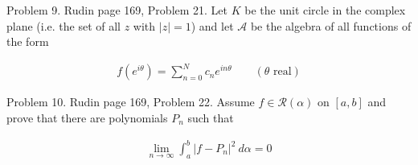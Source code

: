 \documentclass{article}
\begin{document}
 \pagebreak
 {\Large \color{Sepia} Problem 9. Rudin page 169, Problem 21. Let $K$ be the unit circle in the complex plane (i.e. the set of all $z$ with $|z|=1$) and let $\mathcal A$ be the algebra of all functions of the form 
 
 \begin{align*}
    f(e^{i\theta})=\sum_{n=0}^N c_n e^{in\theta} \qquad (\theta \text{ real})
 \end{align*}
 
 
 
 }

 \vspace{1cm} 


  \pagebreak
  {\Large \color{Sepia} Problem 10. Rudin page 169, Problem 22. Assume $f\in\mathscr R(\alpha)$ on $[a,b]$ and prove that there are polynomials $P_n$ such that 
  
  \begin{align*}
    \lim_{n\to \infty}\int_a^b |f-P_n|^2 \ d\alpha = 0
  \end{align*}
  
  }

  \vspace{1cm} 


   \pagebreak
\end{document}
